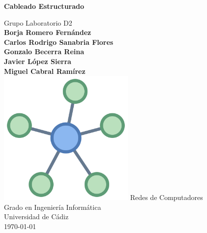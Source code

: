 \begin{titlepage}
   \begin{center}
       \vspace*{1cm}
 
       \textbf{Cableado Estructurado}
 
       \vspace{0.5cm}
        Grupo Laboratorio D2\\
       \vspace{3cm}
       \textbf{Borja Romero Fernández\\
            Carlos Rodrigo Sanabria Flores\\
            Gonzalo Becerra Reina\\
            Javier López Sierra\\
            Miguel Cabral Ramírez\\}
       \vspace{5cm}
       \includegraphics[width=0.5\textwidth]{images/redes.png}
       \vfill
       Redes de Computadores\\
       Grado en Ingeniería Informática\\
       Universidad de Cádiz\\
       \today
 
   \end{center}
\end{titlepage}